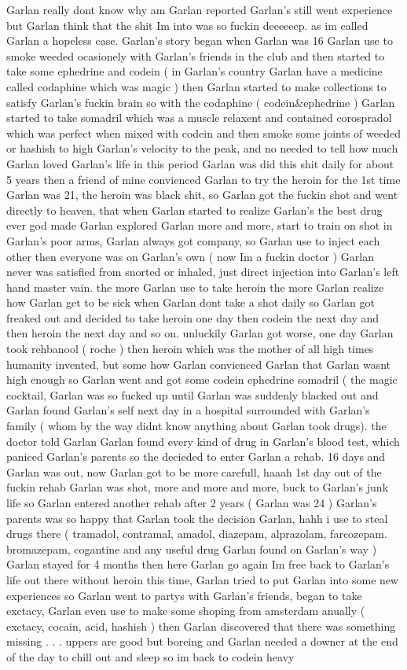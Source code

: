 \documentclass[12pt]{book}
\begin{document}
Garlan really dont know why am Garlan reported Garlan's still went experience but Garlan think that the shit Im into was so fuckin deeeeeep. as im called Garlan a hopeless case. Garlan's story began when Garlan was 16 Garlan use to smoke weeded ocasionely with Garlan's friends in the club and then started to take some ephedrine and codein ( in Garlan's country Garlan have a medicine called codaphine which was magic ) then Garlan started to make collections to satisfy Garlan's fuckin brain so with the codaphine ( codein\&ephedrine ) Garlan started to take somadril which was a muscle relaxent and contained corospradol which was perfect when mixed with codein and then smoke some joints of weeded or hashish to high Garlan's velocity to the peak, and no needed to tell how much Garlan loved Garlan's life in this period Garlan was did this shit daily for about 5 years then a friend of mine convienced Garlan to try the heroin for the 1st time Garlan was 21, the heroin was black shit, so Garlan got the fuckin shot and went directly to heaven, that when Garlan started to realize Garlan's the best drug ever god made Garlan explored Garlan more and more, start to train on shot in Garlan's poor arms, Garlan always got company, so Garlan use to inject each other then everyone was on Garlan's own ( now Im a fuckin doctor ) Garlan never was satisfied from snorted or inhaled, just direct injection into Garlan's left hand master vain. the more Garlan use to take heroin the more Garlan realize how Garlan get to be sick when Garlan dont take a shot daily so Garlan got freaked out and decided to take heroin one day then codein the next day and then heroin the next day and so on. unluckily Garlan got worse, one day Garlan took rehbanool ( roche ) then heroin which was the mother of all high times humanity invented, but some how Garlan convienced Garlan that Garlan wasnt high enough so Garlan went and got some codein ephedrine somadril ( the magic cocktail, Garlan was so fucked up until Garlan was suddenly blacked out and Garlan found Garlan's self next day in a hospital surrounded with Garlan's family ( whom by the way didnt know anything about Garlan took drugs). the doctor told Garlan Garlan found every kind of drug in Garlan's blood test, which paniced Garlan's parents so the decieded to enter Garlan a rehab. 16 days and Garlan was out, now Garlan got to be more carefull, haaah 1st day out of the fuckin rehab Garlan was shot, more and more and more, buck to Garlan's junk life so Garlan entered another rehab after 2 years ( Garlan was 24 ) Garlan's parents was so happy that Garlan took the decision Garlan, hahh i use to steal drugs there ( tramadol, contramal, amadol, diazepam, alprazolam, farcozepam. bromazepam, cogantine and any useful drug Garlan found on Garlan's way ) Garlan stayed for 4 months then here Garlan go again Im free back to Garlan's life out there without heroin this time, Garlan tried to put Garlan into some new experiences so Garlan went to partys with Garlan's friends, began to take exctacy, Garlan even use to make some shoping from amsterdam anually ( exctacy, cocain, acid, hashish ) then Garlan discovered that there was something missing . . .  uppers are good but boreing and Garlan needed a downer at the end of the day to chill out and sleep so im back to codein heavy 
\end{document}
